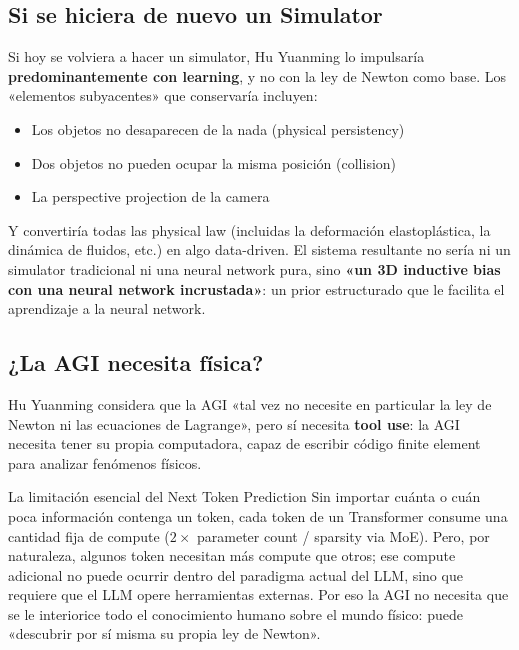 \documentclass[a4paper]{article}
\begin{document}
\subsection{Si se hiciera de nuevo un Simulator}

Si hoy se volviera a hacer un simulator, Hu Yuanming lo impulsaría \textbf{predominantemente con learning}, y no con la ley de Newton como base. Los «elementos subyacentes» que conservaría incluyen:
\begin{itemize}
\item Los objetos no desaparecen de la nada (physical persistency)
\item Dos objetos no pueden ocupar la misma posición (collision)
\item La perspective projection de la camera
\end{itemize}

Y convertiría todas las physical law (incluidas la deformación elastoplástica, la dinámica de fluidos, etc.) en algo data-driven. El sistema resultante no sería ni un simulator tradicional ni una neural network pura, sino \textbf{«un 3D inductive bias con una neural network incrustada»}: un prior estructurado que le facilita el aprendizaje a la neural network.

\subsection{¿La AGI necesita física?}

Hu Yuanming considera que la AGI «tal vez no necesite en particular la ley de Newton ni las ecuaciones de Lagrange», pero sí necesita \textbf{tool use}: la AGI necesita tener su propia computadora, capaz de escribir código finite element para analizar fenómenos físicos.

\begin{knowledgebox}{La limitación esencial del Next Token Prediction}
Sin importar cuánta o cuán poca información contenga un token, cada token de un Transformer consume una cantidad fija de compute ($2 \times$ parameter count / sparsity via MoE). Pero, por naturaleza, algunos token necesitan más compute que otros; ese compute adicional no puede ocurrir dentro del paradigma actual del LLM, sino que requiere que el LLM opere herramientas externas. Por eso la AGI no necesita que se le interiorice todo el conocimiento humano sobre el mundo físico: puede «descubrir por sí misma su propia ley de Newton».
\end{knowledgebox}
\end{document}

